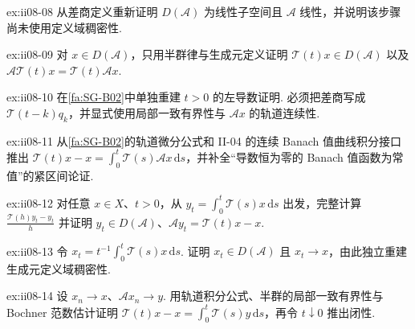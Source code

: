 \begin{FAExercise}[生成元定义域与线性]{ex:ii08-08}
从差商定义重新证明 \(\displaystyle D(\mathcal A)\) 为线性子空间且 \(\displaystyle\mathcal A\) 线性，并说明该步骤尚未使用定义域稠密性.
\end{FAExercise}

\begin{FAExercise}[生成元域不变与轨道微分的域不变性]{ex:ii08-09}
对 \(\displaystyle x\in D(\mathcal A)\)，只用半群律与生成元定义证明 \(\displaystyle\mathcal T(t)x\in D(\mathcal A)\) 以及 \(\displaystyle\mathcal A\mathcal T(t)x=\mathcal T(t)\mathcal Ax\).
\end{FAExercise}

\begin{FAExercise}[轨道的左导数]{ex:ii08-10}
在\autoref{fa:SG-B02}中单独重建 \(\displaystyle t>0\) 的左导数证明. 必须把差商写成 \(\displaystyle\mathcal T(t-k)q_k\)，并显式使用局部一致有界性与 \(\displaystyle\mathcal Ax\) 的轨道连续性.
\end{FAExercise}

\begin{FAExercise}[轨道积分公式]{ex:ii08-11}
从\autoref{fa:SG-B02}的轨道微分公式和 II-04 的连续 Banach 值曲线积分接口推出 \(\displaystyle\mathcal T(t)x-x=\int_0^t\mathcal T(s)\mathcal Ax\,\mathrm{d}s\)，并补全“导数恒为零的 Banach 值函数为常值”的紧区间论证.
\end{FAExercise}

\begin{FAExercise}[轨道积分正则化]{ex:ii08-12}
对任意 \(\displaystyle x\in X\)、\(\displaystyle t>0\)，从 \(\displaystyle y_t=\int_0^t\mathcal T(s)x\,\mathrm{d}s\) 出发，完整计算 \(\displaystyle\frac{\mathcal T(h)y_t-y_t}{h}\) 并证明 \(\displaystyle y_t\in D(\mathcal A)\)、\(\displaystyle\mathcal Ay_t=\mathcal T(t)x-x\).
\end{FAExercise}

\begin{FAExercise}[平均正则化与定义域稠密]{ex:ii08-13}
令 \(\displaystyle x_t=t^{-1}\int_0^t\mathcal T(s)x\,\mathrm{d}s\). 证明 \(\displaystyle x_t\in D(\mathcal A)\) 且 \(\displaystyle x_t\to x\)，由此独立重建生成元定义域稠密性.
\end{FAExercise}

\begin{FAExercise}[生成元闭性]{ex:ii08-14}
设 \(\displaystyle x_n\to x\)、\(\displaystyle\mathcal Ax_n\to y\). 用轨道积分公式、半群的局部一致有界性与 Bochner 范数估计证明 \(\displaystyle\mathcal T(t)x-x=\int_0^t\mathcal T(s)y\,\mathrm{d}s\)，再令 \(\displaystyle t\downarrow0\) 推出闭性.
\end{FAExercise}

